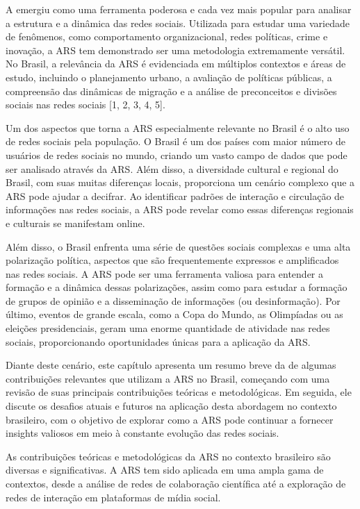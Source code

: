 A  emergiu como uma ferramenta poderosa e cada vez mais popular para analisar a estrutura e a dinâmica das redes sociais. Utilizada para estudar uma variedade de fenômenos, como comportamento organizacional, redes políticas, crime e inovação, a ARS tem demonstrado ser uma metodologia extremamente versátil. No Brasil, a relevância da ARS é evidenciada em múltiplos contextos e áreas de estudo, incluindo o planejamento urbano, a avaliação de políticas públicas, a compreensão das dinâmicas de migração e a análise de preconceitos e divisões sociais nas redes sociais [1, 2, 3, 4, 5].

Um dos aspectos que torna a {ARS} especialmente relevante no Brasil é o alto uso de redes sociais pela população. O Brasil é um dos países com maior número de usuários de redes sociais no mundo, criando um vasto campo de dados que pode ser analisado através da {ARS}. Além disso, a diversidade cultural e regional do Brasil, com suas muitas diferenças locais, proporciona um cenário complexo que a ARS pode ajudar a decifrar. Ao identificar padrões de interação e circulação de informações nas redes sociais, a ARS pode revelar como essas diferenças regionais e culturais se manifestam online.

Além disso, o Brasil enfrenta uma série de questões sociais complexas e uma alta polarização política, aspectos que são frequentemente expressos e amplificados nas redes sociais. A ARS pode ser uma ferramenta valiosa para entender a formação e a dinâmica dessas polarizações, assim como para estudar a formação de grupos de opinião e a disseminação de informações (ou desinformação). Por último, eventos de grande escala, como a Copa do Mundo, as Olimpíadas ou as eleições presidenciais, geram uma enorme quantidade de atividade nas redes sociais, proporcionando oportunidades únicas para a aplicação da ARS.

Diante deste cenário, este capítulo apresenta um resumo breve da de algumas contribuições relevantes que utilizam a ARS no Brasil, começando com uma revisão de suas principais contribuições teóricas e metodológicas. Em seguida, ele discute os desafios atuais e futuros na aplicação desta abordagem no contexto brasileiro, com o objetivo de explorar como a ARS pode continuar a fornecer insights valiosos em meio à constante evolução das redes sociais.

As contribuições teóricas e metodológicas da ARS no contexto brasileiro são diversas e significativas. A ARS tem sido aplicada em uma ampla gama de contextos, desde a análise de redes de colaboração científica até a exploração de redes de interação em plataformas de mídia social.

